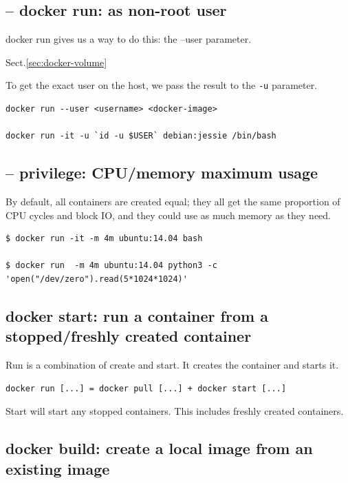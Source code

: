 \subsection{-- docker run: as non-root user}

docker run gives us a way to do this: the --user parameter.

Sect.\ref{sec:docker-volume}

To get the exact user on the host, we pass the result to the \verb!-u! parameter.

\begin{verbatim}
docker run --user <username> <docker-image>
 
docker run -it -u `id -u $USER` debian:jessie /bin/bash
\end{verbatim}

\subsection{-- privilege: CPU/memory maximum usage}


By default, all containers are created equal; they all get the same proportion
of CPU cycles and block IO, and they could use as much memory as they need.

\begin{verbatim}
$ docker run -it -m 4m ubuntu:14.04 bash

$ docker run  -m 4m ubuntu:14.04 python3 -c 'open("/dev/zero").read(5*1024*1024)'
\end{verbatim}

\subsection{docker start: run a container from a stopped/freshly created container}
\label{sec:docker-start}

Run is a combination of create and start. It creates the container and starts it.
\begin{verbatim}
docker run [...] = docker pull [...] + docker start [...]
\end{verbatim}

Start will start any stopped containers. This includes freshly created containers.



\subsection{docker build: create a local image from an existing image}
\label{sec:docker-build}

